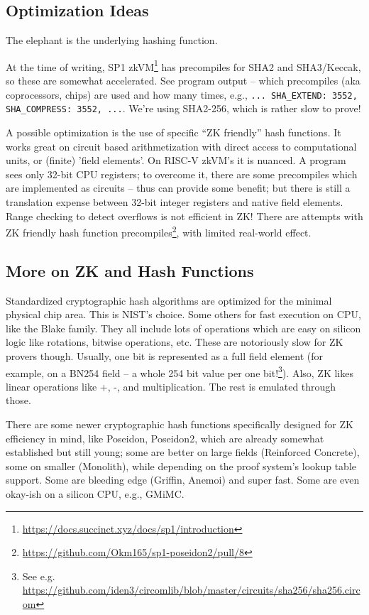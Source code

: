 \documentclass[twocolumn]{article}
\begin{document}
\subsection{Optimization Ideas}

The elephant is the underlying hashing function.

At the time of writing, SP1 zkVM\footnote{\url{https://docs.succinct.xyz/docs/sp1/introduction}} has precompiles for SHA2 and SHA3/Keccak, so these are somewhat accelerated. See program output -- which precompiles (aka coprocessors, chips) are used and how many times, e.g., \lstinline|... SHA_EXTEND: 3552, SHA_COMPRESS: 3552, ...|. We're using SHA2-256, which is rather slow to prove!

A possible optimization is the use of specific ``ZK friendly'' hash functions. It works great on circuit based arithmetization with direct access to computational units, or (finite) 'field elements'. On RISC-V zkVM's it is nuanced. A program sees only 32-bit CPU registers; to overcome it, there are some precompiles which are implemented as circuits -- thus can provide some benefit; but there is still a translation expense between 32-bit integer registers and native field elements. Range checking to detect overflows is not efficient in ZK! There are attempts with ZK friendly hash function precompiles\footnote{\url{https://github.com/Okm165/sp1-poseidon2/pull/8}}, with limited real-world effect.


\subsection{More on ZK and Hash Functions}

Standardized cryptographic hash algorithms are optimized for the minimal physical chip area. This is NIST's choice. Some others for fast execution on CPU, like the Blake family. They all include lots of operations which are easy on silicon logic like rotations, bitwise operations, etc. These are notoriously slow for ZK provers though. Usually, one bit is represented as a full field element (for example, on a BN254 field -- a whole 254 bit value per one bit!\footnote{See e.g. \url{https://github.com/iden3/circomlib/blob/master/circuits/sha256/sha256.circom}}). Also, ZK likes linear operations like +, -, and multiplication. The rest is emulated through those.

There are some newer cryptographic hash functions specifically designed for ZK efficiency in mind, like Poseidon, Poseidon2, which are already somewhat established but still young; some are better on large fields (Reinforced Concrete), some on smaller (Monolith), while depending on the proof system's lookup table support. Some are bleeding edge (Griffin, Anemoi) and super fast. Some are even okay-ish on a silicon CPU, e.g., GMiMC.
\end{document}
